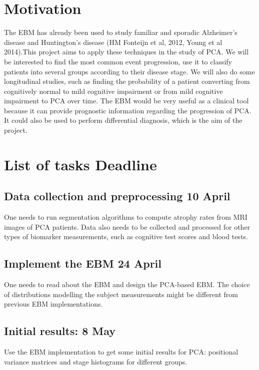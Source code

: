 \documentclass[12pt,a4paper,oneside]{report}
\begin{document}
\section*{Motivation}

The EBM has already been used to study familiar and sporadic Alzheimer's disease and Huntington's disease (HM Fonteijn et al, 2012, Young et al 2014).This project aims to apply these techniques in the study of PCA. We will be interested to find the most common event progression, use it to classify patients into several groups according to their disease stage. We will also do some longitudinal studies, such as finding the probability of a patient converting from cognitively normal to mild cognitive impairment or from mild cognitive impairment to PCA over time. The EBM would be very useful as a clinical tool because it can provide prognostic information regarding the progression of PCA. It could also be used to perform differential diagnosis, which is the aim of the project.


\section*{List of tasks \hfill Deadline}

\renewcommand\arraystretch{4.4} %
\newcommand\taskHeader[1]{\Large{\textbf{#1}}}

\subsection*{\noindent Data collection and preprocessing \hfill 10 April}

One needs to run segmentation algorithms to compute atrophy rates from MRI images of PCA patients. Data also needs to be collected and processed for other types of biomarker measurements, such as cognitive test scores and blood tests.

\subsection*{\noindent Implement the EBM \hfill 24 April}

One needs to read about the EBM and design the PCA-based EBM. The choice of distributions modelling the subject measurements might be different from previous EBM implementations.

\subsection*{\noindent Initial results: \hfill  8 May} 
Use the EBM implementation to get some initial results for PCA: positional variance matrices and stage histograms for different groups.
\end{document}
